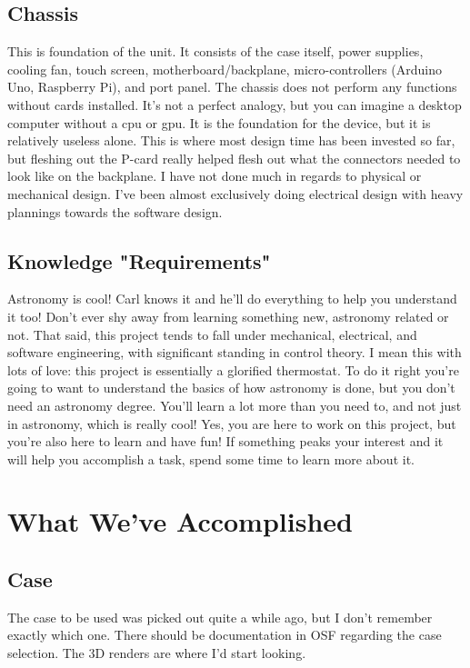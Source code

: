 \documentclass[prb,preprint]{revtex4-1}
\begin{document}
\subsection{Chassis}
This is foundation of the unit. It consists of the case itself, power supplies, cooling fan, touch screen, motherboard/backplane, micro-controllers (Arduino Uno, Raspberry Pi), and port panel. The chassis does not perform any functions without cards installed. It's not a perfect analogy, but you can imagine a desktop computer without a cpu or gpu. It is the foundation for the device, but it is relatively useless alone. This is where most design time has been invested so far, but fleshing out the P-card really helped flesh out what the connectors needed to look like on the backplane. I have not done much in regards to physical or mechanical design. I've been almost exclusively doing electrical design with heavy plannings towards the software design.


\subsection{Knowledge "Requirements"}
Astronomy is cool! Carl knows it and he'll do everything to help you understand it too! Don't ever shy away from learning something new, astronomy related or not. That said, this project tends to fall under mechanical, electrical, and software engineering, with significant standing in control theory. I mean this with lots of love: this project is essentially a glorified thermostat. To do it right you're going to want to understand the basics of how astronomy is done, but you don't need an astronomy degree. You'll learn a lot more than you need to, and not just in astronomy, which is really cool! Yes, you are here to work on this project, but you're also here to learn and have fun! If something peaks your interest and it will help you accomplish a task, spend some time to learn more about it.

\section{What We've Accomplished}
\subsection{Case}
The case to be used was picked out quite a while ago, but I don't remember exactly which one. There should be documentation in OSF regarding the case selection. The 3D renders are where I'd start looking.
\end{document}
